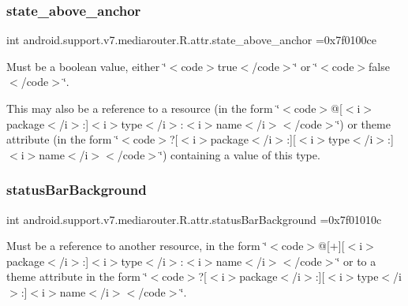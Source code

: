 \subsubsection{\texorpdfstring{state\+\_\+above\+\_\+anchor}{state\_above\_anchor}}
{\footnotesize\ttfamily int android.\+support.\+v7.\+mediarouter.\+R.\+attr.\+state\+\_\+above\+\_\+anchor =0x7f0100ce\hspace{0.3cm}{\ttfamily [static]}}

Must be a boolean value, either \char`\"{}$<$code$>$true$<$/code$>$\char`\"{} or \char`\"{}$<$code$>$false$<$/code$>$\char`\"{}. 

This may also be a reference to a resource (in the form \char`\"{}$<$code$>$@\mbox{[}$<$i$>$package$<$/i$>$\+:\mbox{]}$<$i$>$type$<$/i$>$\+:$<$i$>$name$<$/i$>$$<$/code$>$\char`\"{}) or theme attribute (in the form \char`\"{}$<$code$>$?\mbox{[}$<$i$>$package$<$/i$>$\+:\mbox{]}\mbox{[}$<$i$>$type$<$/i$>$\+:\mbox{]}$<$i$>$name$<$/i$>$$<$/code$>$\char`\"{}) containing a value of this type. \mbox{\label{classandroid_1_1support_1_1v7_1_1mediarouter_1_1R_1_1attr_a1cf3a847f3fe4c1f3844025cd72bee50}} 
\subsubsection{\texorpdfstring{status\+Bar\+Background}{statusBarBackground}}
{\footnotesize\ttfamily int android.\+support.\+v7.\+mediarouter.\+R.\+attr.\+status\+Bar\+Background =0x7f01010c\hspace{0.3cm}{\ttfamily [static]}}

Must be a reference to another resource, in the form \char`\"{}$<$code$>$@\mbox{[}+\mbox{]}\mbox{[}$<$i$>$package$<$/i$>$\+:\mbox{]}$<$i$>$type$<$/i$>$\+:$<$i$>$name$<$/i$>$$<$/code$>$\char`\"{} or to a theme attribute in the form \char`\"{}$<$code$>$?\mbox{[}$<$i$>$package$<$/i$>$\+:\mbox{]}\mbox{[}$<$i$>$type$<$/i$>$\+:\mbox{]}$<$i$>$name$<$/i$>$$<$/code$>$\char`\"{}. \mbox{\label{classandroid_1_1support_1_1v7_1_1mediarouter_1_1R_1_1attr_aedf7a192f38a7835b73424353ad41371}} 
